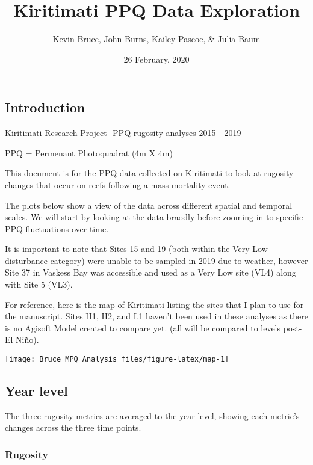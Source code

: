\documentclass[]{article}
\title{Kiritimati PPQ Data Exploration}
\author{Kevin Bruce, John Burns, Kailey Pascoe, \& Julia Baum}
\date{26 February, 2020}
\begin{document}
\maketitle

{
\setcounter{tocdepth}{2}
\tableofcontents
}
\hypertarget{introduction}{%
\subsection{Introduction}\label{introduction}}

Kiritimati Research Project- PPQ rugosity analyses 2015 - 2019

PPQ = Permenant Photoquadrat (4m X 4m)

This document is for the PPQ data collected on Kiritimati to look at
rugosity changes that occur on reefs following a mass mortality event.

The plots below show a view of the data across different spatial and
temporal scales. We will start by looking at the data braodly before
zooming in to specific PPQ fluctuations over time.

It is important to note that Sites 15 and 19 (both within the Very Low
disturbance category) were unable to be sampled in 2019 due to weather,
however Site 37 in Vaskess Bay was accessible and used as a Very Low
site (VL4) along with Site 5 (VL3).

For reference, here is the map of Kiritimati listing the sites that I
plan to use for the manuscript. Sites H1, H2, and L1 haven't been used
in these analyses as there is no Agisoft Model created to compare yet.
(all will be compared to levels post-El Niño).

\begin{center}\texttt{[image: Bruce\_MPQ\_Analysis\_files/figure-latex/map-1]} \end{center}

\hypertarget{year-level}{%
\subsection{Year level}\label{year-level}}

The three rugosity metrics are averaged to the year level, showing each
metric's changes across the three time points.

\hypertarget{rugosity}{%
\subsubsection{Rugosity}\label{rugosity}}
\end{document}
